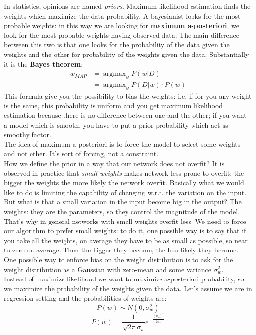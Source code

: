 In statistics, opinions are named \textit{priors}. Maximum likelihood estimation finds the weights which maximize the data probability. A bayesianist looks for the most probable weights: in this way we are looking for \textbf{maximum a-posteriori}, we look for the most probable weights having observed data. The main difference between this two is that one looks for the probability of the data given the weights and the other for probability of the weights given the data. Substantially it is the \textbf{Bayes theorem}: $$
\begin{aligned}
w_{M A P} &=\operatorname{argmax}_{w} P(w | D) \\
&=\operatorname{argmax}_{w} P(D | w) \cdot P(w)
\end{aligned}
$$
This formula give you the possibility to bias the weights: i.e. if for you any weight is the same, this probability is uniform and you get maximum likelihood estimation because there is no difference between one and the other; if you want a model which is smooth, you have to put a prior probability which act as smoothy factor. \\
The idea of maximum a-posteriori is to force the model to select some weights and not other. It's sort of forcing, not a constraint. \\

How we define the prior in a way that our network does not overfit? It is observed in practice that \textit{small weights} makes network less prone to overfit; the bigger the weights the more likely the network overfit. Basically what we would like to do is limiting the capability of changing w.r.t. the variation on the input. \\
But what is that a small variation in the input become big in the output? The weights: they are the parameters, so they control the magnitude of the model.  That's why in general networks with small weights overfit less. We need to force our algorithm to prefer small weights: to do it, one possible way is to say that if you take all the weights, on average they have to be as small as possible, so near to zero on average. Then the bigger they become, the less likely they become. \\

One possible way to enforce bias on the weight distribution is to ask for the weight distribution as a Gaussian with zero-mean and some variance $\sigma_w^2$. \\
Instead of maximize likelihood we want to maximize a-posteriori probability, so we maximize the probability of the weights given the data. Let's assume we are in regression setting and the probabilities of weights are:
$$
P(w) \sim N\left(0, \sigma_{w}^{2}\right)
$$
$$
P(w) =  \frac{1}{\sqrt{2 \pi} \sigma_{w}} e^{-\frac{\left(w_{q}\right)^{2}}{2 \sigma_{w}^{2}}}
$$

